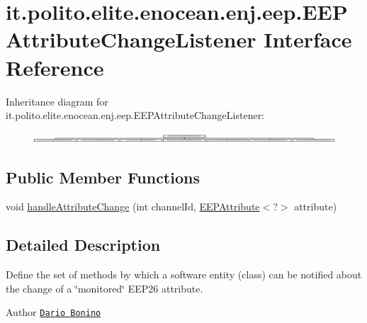 \hypertarget{interfaceit_1_1polito_1_1elite_1_1enocean_1_1enj_1_1eep_1_1_e_e_p_attribute_change_listener}{}\section{it.\+polito.\+elite.\+enocean.\+enj.\+eep.\+E\+E\+P\+Attribute\+Change\+Listener Interface Reference}
\label{interfaceit_1_1polito_1_1elite_1_1enocean_1_1enj_1_1eep_1_1_e_e_p_attribute_change_listener}
Inheritance diagram for it.\+polito.\+elite.\+enocean.\+enj.\+eep.\+E\+E\+P\+Attribute\+Change\+Listener\+:\begin{figure}[H]
\begin{center}
\leavevmode
\includegraphics[height=0.377358cm]{interfaceit_1_1polito_1_1elite_1_1enocean_1_1enj_1_1eep_1_1_e_e_p_attribute_change_listener}
\end{center}
\end{figure}
\subsection*{Public Member Functions}
\begin{DoxyCompactItemize}
\item 
void \hyperlink{interfaceit_1_1polito_1_1elite_1_1enocean_1_1enj_1_1eep_1_1_e_e_p_attribute_change_listener_a8ed543f4de048252dfd133116d488382}{handle\+Attribute\+Change} (int channel\+Id, \hyperlink{classit_1_1polito_1_1elite_1_1enocean_1_1enj_1_1eep_1_1_e_e_p_attribute}{E\+E\+P\+Attribute}$<$?$>$ attribute)
\end{DoxyCompactItemize}


\subsection{Detailed Description}
Define the set of methods by which a software entity (class) can be notified about the change of a \char`\"{}monitored\char`\"{} E\+E\+P26 attribute.

\begin{DoxyAuthor}{Author}
\href{mailto:dario.bonino@gmail.com}{\tt Dario Bonino} 
\end{DoxyAuthor}


